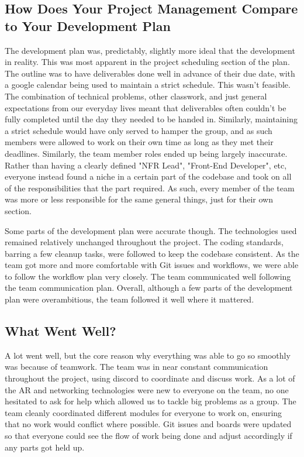 \documentclass{article}
\begin{document}
\subsection{How Does Your Project Management Compare to Your Development Plan}

The development plan was, predictably, slightly more ideal that the development in reality. This was most apparent in the project scheduling section of the plan. The outline was to have deliverables done well in advance of their due date, with a google calendar being used to maintain a strict schedule. This wasn't feasible. The combination of technical problems, other classwork, and just general expectations from our everyday lives meant that deliverables often couldn't be fully completed until the day they needed to be handed in. Similarly, maintaining a strict schedule would have only served to hamper the group, and as such members were allowed to work on their own time as long as they met their deadlines. Similarly, the team member roles ended up being largely inaccurate. Rather than having a clearly defined "NFR Lead", "Front-End Developer", etc, everyone instead found a niche in a certain part of the codebase and took on all of the responsibilities that the part required. As such, every member of the team was more or less responsible for the same general things, just for their own section.

Some parts of the development plan were accurate though. The technologies used remained relatively unchanged throughout the project. The coding standards, barring a few cleanup tasks, were followed to keep the codebase consistent. As the team got more and more comfortable with Git issues and workflows, we were able to follow the workflow plan very closely. The team communicated well following the team communication plan. Overall, although a few parts of the development plan were overambitious, the team followed it well where it mattered. 

\subsection{What Went Well?}

A lot went well, but the core reason why everything was able to go so smoothly was because of teamwork. The team was in near constant communication throughout the project, using discord to coordinate and discuss work. As a lot of the AR and networking technologies were new to everyone on the team, no one hesitated to ask for help which allowed us to tackle big problems as a group. The team cleanly coordinated different modules for everyone to work on, ensuring that no work would conflict where possible. Git issues and boards were updated so that everyone could see the flow of work being done and adjust accordingly if any parts got held up. 
\end{document}
